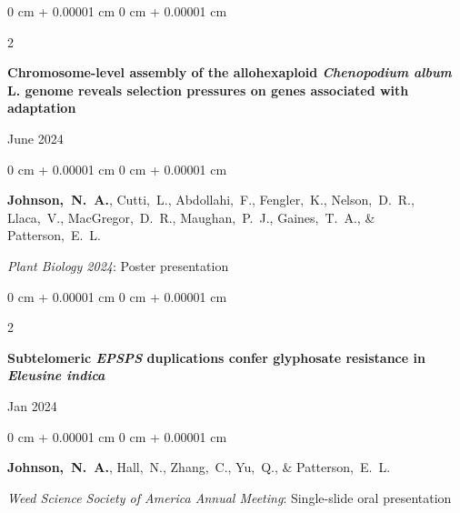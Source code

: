 \documentclass[10pt, letterpaper]{article}
\newenvironment{onecolentry}{
    \begin{adjustwidth}{
        0 cm + 0.00001 cm
    }{
        0 cm + 0.00001 cm
    }
}{
    \end{adjustwidth}
} %
\newenvironment{twocolentry}[2][]{
    \onecolentry
    \def\secondColumn{#2}
    \setcolumnwidth{\fill, 4.5 cm}
    \begin{paracol}{2}
}{
    \switchcolumn \raggedleft \secondColumn
    \end{paracol}
    \endonecolentry
} %
\begin{document}
        
        \begin{samepage}
            \begin{twocolentry}{
                June 2024
                }
                \textbf{Chromosome-level assembly of the allohexaploid \textit{Chenopodium album} L. genome reveals selection pressures on genes associated with adaptation}
            \end{twocolentry}

            \vspace{0.10 cm}
            
            \begin{onecolentry}
                \mbox{\textbf{Johnson, N. A.}}, \mbox{Cutti, L.}, \mbox{Abdollahi, F.}, \mbox{Fengler, K.}, \mbox{Nelson, D. R.}, \mbox{Llaca, V.}, \mbox{MacGregor, D. R.}, \mbox{Maughan, P. J.}, \mbox{Gaines, T. A.}, \& \mbox{Patterson, E. L.}

                \vspace{0.10 cm}
                
                \textit{Plant Biology 2024}: Poster presentation
            \end{onecolentry}
        \end{samepage}


        \vspace{0.2 cm}
        

        \begin{samepage}
            \begin{twocolentry}{
                Jan 2024
            }
                \textbf{Subtelomeric \textit{EPSPS} duplications confer glyphosate resistance in \textit{Eleusine indica}}
            \end{twocolentry}

            \vspace{0.10 cm}
            
            \begin{onecolentry}
                \mbox{\textbf{Johnson, N. A.}}, \mbox{Hall, N.}, \mbox{Zhang, C.}, \mbox{Yu, Q.}, \& \mbox{Patterson, E. L.}

                \vspace{0.10 cm}
                
                \textit{Weed Science Society of America Annual Meeting}: Single-slide oral presentation
            \end{onecolentry}
        \end{samepage}
\end{document}
